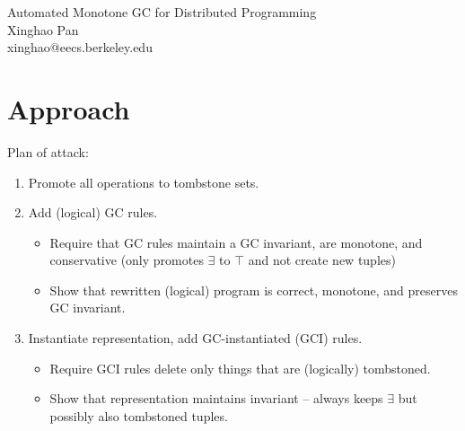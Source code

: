 \documentclass[10pt]{proc}
\begin{document}
\onecolumn
\begin{center}
{\LARGE Automated Monotone GC for Distributed Programming}
\\{\large Xinghao Pan\\xinghao@eecs.berkeley.edu}
\end{center}
\fancyhead{}
\fancyfoot{}
\rhead{\today}
\cfoot{\thepage}




\begin{abstract}
Edelweiss \cite{conway2014edelweiss} provides automatic garbage collection for event log exhanges, programs which monotonically accumulate logs.
However, in the process of doing so, it introduced additional points of coordination through non-monotone operations, thereby defeating the original purpose of ELEs to avoid synchronization and coordination.
In this paper, we show that garbage collection for ELEs can in fact be monotone and coordination-free.
We explicitly recast Edelweiss techniques as monotone operations on lattices defined over the input sets.
\end{abstract}

\section{Approach}
Plan of attack:
\begin{enumerate}
\item Promote all operations to tombstone sets.
\item Add (logical) GC rules.
  \begin{itemize}
  \item Require that GC rules maintain a GC invariant, are monotone, and conservative (only promotes $\exists$ to $\top$ and not create new tuples)
  \item Show that rewritten (logical) program is correct, monotone, and preserves GC invariant.
  \end{itemize}
\item Instantiate representation, add GC-instantiated (GCI) rules.
  \begin{itemize}
  \item Require GCI rules delete only things that are (logically) tombstoned.
  \item Show that representation maintains invariant -- always keeps $\exists$ but possibly also tombstoned tuples.
  \end{itemize}
\end{enumerate}
\end{document}
